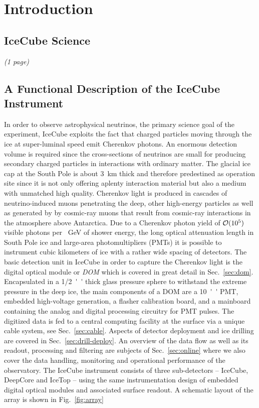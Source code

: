 
\section{Introduction}
\label{sec:intro}

\subsection{IceCube Science}
\textsl{(1 page)}

\subsection{A Functional Description of the IceCube Instrument}

In order to observe astrophysical neutrinos, the primary science goal of the experiment, IceCube exploits the fact that charged particles moving through
the ice at super-luminal speed emit Cherenkov photons. An enormous detection volume is required since the cross-sections of neutrinos are small for producing secondary charged particles in interactions with ordinary matter. The glacial ice cap at the South Pole is about \SI{3}{\kilo\meter} thick and therefore predestined as operation site since it is not only offering aplenty interaction material but also a medium with unmatched high quality. 
Cherenkov light is produced in cascades of neutrino-induced muons penetrating the deep, other high-energy particles as well as generated by by cosmic-ray muons that result from cosmic-ray interactions in the atmosphere above Antarctica. 
Due to a Cherenkov photon yield of $\mathcal{O}(\num{E5})$ visible photons per \SI{}{\giga\electronvolt} of shower energy, the long optical attenuation length in South Pole ice and large-area photomultipliers (PMTs) it is possible to instrument cubic kilometers of ice with a rather wide spacing of detectors.  
The basic detection unit in IceCube in order to capture the Cherenkov light is the digital optical module or \textit{DOM} which is covered in great detail in Sec.~\ref{sec:dom}. Encapsulated in a \SI{1/2}{''} thick glass pressure sphere to withstand the extreme pressure in the deep ice, the main components of a DOM are a \SI{10}{''} PMT, embedded high-voltage generation, a flasher calibration board, and a mainboard containing the analog and digital processing circuitry for PMT pulses. 
The digitized data is fed to a central computing facility at the surface via a unique cable system, see Sec.~\ref{sec:cable}. 
Aspects of detector deployment and ice drilling are covered in Sec.~\ref{sec:drill-deploy}.
An overview of the data flow as well as its readout, processing and filtering are subjects of Sec.~\ref{sec:online} where we also cover the data handling, monitoring and operational performance of the observatory.
The IceCube instrument consists of three sub-detectors -- IceCube, DeepCore and IceTop -- using the same instrumentation design of embedded digital optical modules and associated surface readout. A schematic layout of the array is shown in Fig.~\ref{fig:array} 

